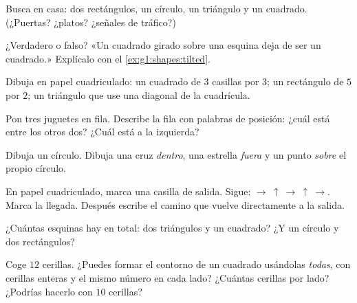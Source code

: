 \begin{exercise}[$\star$]\label{exo:g1:shapes:2}
Busca en casa: dos rectángulos, un círculo, un triángulo y un cuadrado.
(¿Puertas? ¿platos? ¿señales de tráfico?)
\end{exercise}

\begin{exercise}[$\star$]\label{exo:g1:shapes:3}
¿Verdadero o falso? «Un cuadrado girado sobre una esquina deja de ser un
cuadrado.» Explícalo con el \cref{ex:g1:shapes:tilted}.
\end{exercise}

\begin{exercise}[$\star$]\label{exo:g1:shapes:4}
Dibuja en papel cuadriculado: un cuadrado de $3$ casillas por $3$; un rectángulo de
$5$ por $2$; un triángulo que use una diagonal de la cuadrícula.
\end{exercise}

\begin{exercise}[$\star$]\label{exo:g1:shapes:5}
Pon tres juguetes en fila. Describe la fila con palabras de posición:
¿cuál está entre los otros dos? ¿Cuál está a la izquierda?
\end{exercise}

\begin{exercise}[$\star$]\label{exo:g1:shapes:6}
Dibuja un círculo. Dibuja una cruz \emph{dentro}, una estrella
\emph{fuera} y un punto \emph{sobre} el propio círculo.
\end{exercise}

\begin{exercise}[$\star$]\label{exo:g1:shapes:7}
En papel cuadriculado, marca una casilla de salida. Sigue:
$\to\ \uparrow\ \to\ \uparrow\ \to$. Marca la llegada. Después escribe
el camino que vuelve directamente a la salida.
\end{exercise}

\begin{exercise}[$\star$]\label{exo:g1:shapes:8}
¿Cuántas esquinas hay en total: dos triángulos y un cuadrado? ¿Y un círculo
y dos rectángulos?
\end{exercise}

\begin{exercise}[$\star\star$]\label{exo:g1:shapes:9}
Coge $12$ cerillas. ¿Puedes formar el contorno de un cuadrado usándolas
\emph{todas}, con cerillas enteras y el mismo número en cada lado? ¿Cuántas
cerillas por lado? ¿Podrías hacerlo con $10$ cerillas?
\end{exercise}
